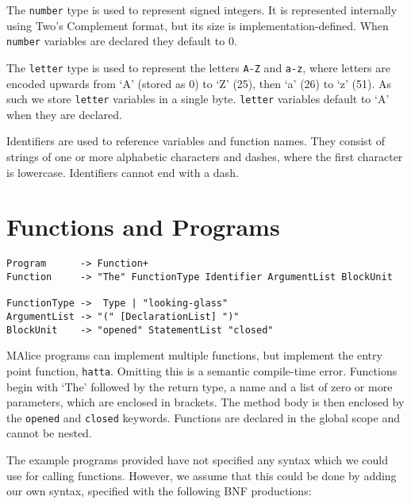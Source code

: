 \documentclass[a4wide, 11pt]{article}
\begin{document}
The \texttt{number} type is used to represent signed integers. It is represented internally using Two's Complement format, but its size is implementation-defined. When \texttt{number} variables are declared they default to 0.

The \texttt{letter} type is used to represent the letters \texttt{A-Z} and \texttt{a-z}, where letters are encoded upwards from `A' (stored as 0) to `Z' (25), then `a' (26) to `z' (51). As such we store \texttt{letter} variables in a single byte. \texttt{letter} variables default to `A' when they are declared.

Identifiers are used to reference variables and function names. They consist of strings of one or more alphabetic characters and dashes, where the first character is lowercase. Identifiers cannot end with a dash.

\section{Functions and Programs}

\begin{verbatim}
Program      -> Function+
Function     -> "The" FunctionType Identifier ArgumentList BlockUnit

FunctionType ->  Type | "looking-glass"
ArgumentList -> "(" [DeclarationList] ")"
BlockUnit    -> "opened" StatementList "closed"
\end{verbatim}

MAlice programs can implement multiple functions, but implement the entry point function, \texttt{hatta}. Omitting this is a semantic compile-time error. Functions begin with `The' followed by the return type, a name and a list of zero or more parameters, which are enclosed in brackets. The method body is then enclosed by the \texttt{opened} and \texttt{closed} keywords. Functions are declared in the global scope and cannot be nested. 




The example programs provided have not specified any syntax which we could use for calling functions. However, we assume that this could be done by adding our own syntax, specified with the following BNF productions:
\end{document}
